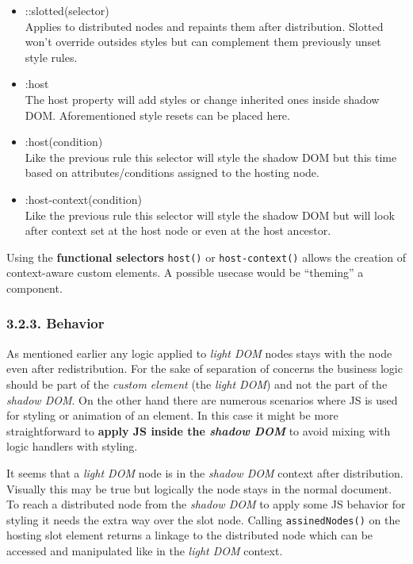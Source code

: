 \documentclass[]{article}
\providecommand{\tightlist}{%
  \setlength{\itemsep}{0pt}\setlength{\parskip}{0pt}}
\begin{document}
\begin{itemize}
\tightlist
\item
  ::slotted(selector)\\
  Applies to distributed nodes and repaints them after distribution.
  Slotted won't override outsides styles but can complement them
  previously unset style rules.
\item
  :host\\
  The host property will add styles or change inherited ones inside
  shadow DOM. Aforementioned style resets can be placed here.
\item
  :host(condition)\\
  Like the previous rule this selector will style the shadow DOM but
  this time based on attributes/conditions assigned to the hosting node.
\item
  :host-context(condition)\\
  Like the previous rule this selector will style the shadow DOM but
  will look after context set at the host node or even at the host
  ancestor.
\end{itemize}

Using the \textbf{functional selectors} \texttt{host()} or
\texttt{host-context()} allows the creation of context-aware custom
elements. A possible usecase would be ``theming'' a component.

\subsubsection{3.2.3. Behavior}\label{behavior}

As mentioned earlier any logic applied to \emph{light DOM} nodes stays
with the node even after redistribution. For the sake of separation of
concerns the business logic should be part of the \emph{custom element}
(the \emph{light DOM}) and not the part of the \emph{shadow DOM}. On the
other hand there are numerous scenarios where JS is used for styling or
animation of an element. In this case it might be more straightforward
to \textbf{apply JS inside the \emph{shadow DOM}} to avoid mixing with
logic handlers with styling.

It seems that a \emph{light DOM} node is in the \emph{shadow DOM}
context after distribution. Visually this may be true but logically the
node stays in the normal document. To reach a distributed node from the
\emph{shadow DOM} to apply some JS behavior for styling it needs the
extra way over the slot node. Calling \texttt{assinedNodes()} on the
hosting slot element returns a linkage to the distributed node which can
be accessed and manipulated like in the \emph{light DOM} context.
\end{document}
